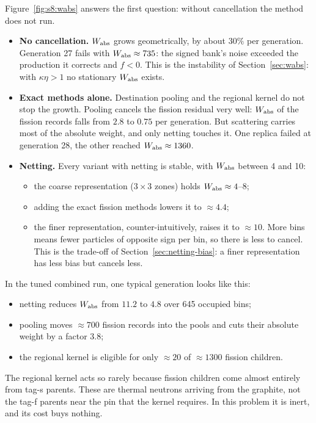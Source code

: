 Figure~\ref{fig:s8:wabs} answers the first question: without cancellation the method does not run.
\begin{itemize}
\item \textbf{No cancellation.} $W_{\mathrm{abs}}$ grows geometrically, by about $30\%$ per generation. Generation
  27 fails with $W_{\mathrm{abs}}\approx735$: the signed bank's noise exceeded the production it corrects and
  $f<0$. This is the instability of Section~\ref{sec:wabs}: with $\kappa\eta>1$ no stationary $W_{\mathrm{abs}}$
  exists.
\item \textbf{Exact methods alone.} Destination pooling and the regional kernel do not stop the
  growth. Pooling cancels the fission residual very well: $W_{\mathrm{abs}}$ of the fission records falls from
  $2.8$ to $0.75$ per generation. But scattering carries most of the absolute weight, and only
  netting touches it. One replica failed at generation 28, the other reached $W_{\mathrm{abs}}\approx1360$.
\item \textbf{Netting.} Every variant with netting is stable, with $W_{\mathrm{abs}}$ between 4 and 10:
  \begin{itemize}
  \item the coarse representation ($3\times3$ zones) holds $W_{\mathrm{abs}}\approx4$--$8$;
  \item adding the exact fission methods lowers it to $\approx4.4$;
  \item the finer representation, counter-intuitively, raises it to $\approx10$. More bins means
    fewer particles of opposite sign per bin, so there is less to cancel. This is the trade-off of
    Section~\ref{sec:netting-bias}: a finer representation has less bias but cancels less.
  \end{itemize}
\end{itemize}
In the tuned combined run, one typical generation looks like this:
\begin{itemize}
\item netting reduces $W_{\mathrm{abs}}$ from $11.2$ to $4.8$ over 645 occupied bins;
\item pooling moves $\approx700$ fission records into the pools and cuts their absolute weight by a
  factor $3.8$;
\item the regional kernel is eligible for only $\approx20$ of $\approx1300$ fission children.
\end{itemize}
The regional kernel acts so rarely because fission children come almost entirely from tag-s parents.
These are thermal neutrons arriving from the graphite, not the tag-f parents near the pin that the
kernel requires. In this problem it is inert, and its cost buys nothing.

